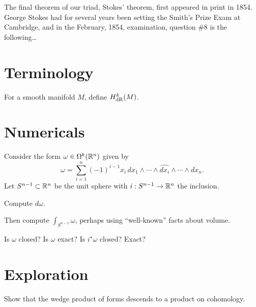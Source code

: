\documentclass{homework}
\author{Jim Fowler}
\begin{document}
\maketitle

\begin{inspiration} The final theorem of our triad, Stokes' theorem,
first appeared in print in 1854.  George Stokes had for several years
been setting the Smith's Prize Exam at Cambridge, and in the February,
1854, examination, question \#8 is the following\ldots {}
\end{inspiration}

\section{Terminology}

\begin{problem}
  For a smooth manifold $M$, define $H^k_{\operatorname{dR}}(M)$.
\end{problem}

\section{Numericals}

\begin{problem}
Consider the form $\omega \in \Omega^k(\mathbb{R}^n)$ given by
\[
  \omega = \sum_{i=1}^n (-1)^{i-1} x_i \, dx_1 \wedge \cdots \wedge \widehat{dx_i} \wedge \cdots \wedge dx_n.
\] Let $S^{n-1} \subset \mathbb{R}^n$ be the unit sphere with $i : S^{n-1} \to
\mathbb{R}^n$ the inclusion.

Compute $d\omega$.


Then compute $\int_{S^{n-1}} \omega$, perhaps
using ``well-known'' facts about volume.
\end{problem}

\begin{problem}
 Is $\omega$ closed?  Is $\omega$ exact?  Is $i^\star \omega$ closed?  Exact?
\end{problem}

\section{Exploration}

\begin{problem} Show that the wedge product of forms descends to a
product on cohomology.
\end{problem}
\end{document}
